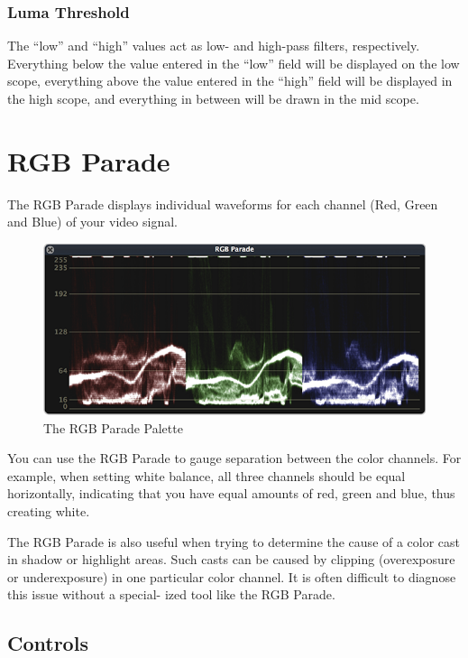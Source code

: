 \documentclass[10,letterpaper,]{report}
\begin{document}
\subsection{Luma Threshold}

The ``low'' and ``high'' values act as low- and high-pass filters,
respectively. Everything below the value entered in the ``low'' field
will be displayed on the low scope, everything above the value entered
in the ``high'' field will be displayed in the high scope, and
everything in between will be drawn in the mid scope.

\chapter{RGB Parade}

The RGB Parade displays individual waveforms for each channel (Red,
Green and Blue) of your video signal.

\begin{figure}[htbp]
\centering
\includegraphics{images/RGBParade.png}
\caption{The RGB Parade Palette}
\end{figure}

You can use the RGB Parade to gauge separation between the color
channels. For example, when setting white balance, all three channels
should be equal horizontally, indicating that you have equal amounts of
red, green and blue, thus creating white.

The RGB Parade is also useful when trying to determine the cause of a
color cast in shadow or highlight areas. Such casts can be caused by
clipping (overexposure or underexposure) in one particular color
channel. It is often difficult to diagnose this issue without a special-
ized tool like the RGB Parade.

\section{Controls}
\end{document}

